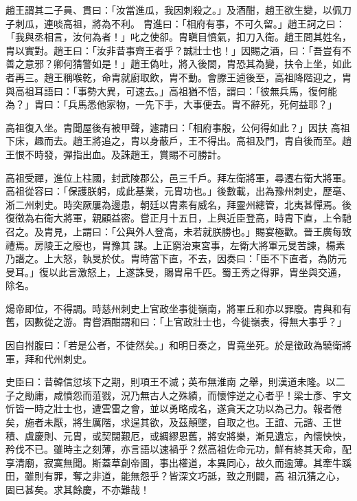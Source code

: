\begin{pinyinscope}
 趙王謂其二子員、貫曰：「汝當進瓜，我因刺殺之。」及酒酣，趙王欲生變，以佩刀子刺瓜，連啖高祖，將為不利。
 胄進曰：「相府有事，不可久留。」趙王訶之曰：「我與丞相言，汝何為者！」叱之使卻。胄瞋目憤氣，扣刀入衛。趙王問其姓名，胄以實對。趙王曰：「汝非昔事齊王者乎？誠壯士也！」因賜之酒，曰：「吾豈有不善之意邪？卿何猜警如是！」趙王偽吐，將入後閤，胄恐其為變，扶令上坐，如此者再三。趙王稱喉乾，命胄就廚取飲，胄不動。會滕王逌後至，高祖降階迎之，胄與高祖耳語曰：「事勢大異，可速去。」高祖猶不悟，謂曰：「彼無兵馬，復何能為？」胄曰：「兵馬悉他家物，一先下手，大事便去。胄不辭死，死何益耶？」



 高祖復入坐。胄聞屋後有被甲聲，遽請曰：「相府事殷，公何得如此？」因扶
 高祖下床，趣而去。趙王將追之，胄以身蔽戶，王不得出。高祖及門，胄自後而至。趙王恨不時發，彈指出血。及誅趙王，賞賜不可勝計。



 高祖受禪，進位上柱國，封武陵郡公，邑三千戶。拜左衛將軍，尋遷右衛大將軍。高祖從容曰：「保護朕躬，成此基業，元胄功也。」後數載，出為豫州刺史，歷亳、淅二州刺史。時突厥屢為邊患，朝廷以胄素有威名，拜靈州總管，北夷甚憚焉。後復徵為右衛大將軍，親顧益密。嘗正月十五日，上與近臣登高，時胄下直，上令馳召之。及胄見，上謂曰：「公與外人登高，未若就朕勝也。」賜宴極歡。晉王廣每致禮焉。房陵王之廢也，胄豫其
 謀。上正窮治東宮事，左衛大將軍元旻苦諫，楊素乃譖之。上大怒，執旻於仗。胄時當下直，不去，因奏曰：「臣不下直者，為防元旻耳。」復以此言激怒上，上遂誅旻，賜胄帛千匹。蜀王秀之得罪，胄坐與交通，除名。



 煬帝即位，不得調。時慈州刺史上官政坐事徙嶺南，將軍丘和亦以罪廢。胄與和有舊，因數從之游。胄嘗酒酣謂和曰：「上官政壯士也，今徙嶺表，得無大事乎？」



 因自拊腹曰：「若是公者，不徒然矣。」和明日奏之，胄竟坐死。於是徵政為驍衛將軍，拜和代州刺史。



 史臣曰：昔韓信愆垓下之期，則項王不滅；英布無淮南
 之舉，則漢道未隆。以二子之勛庸，咸憤怨而菹戮，況乃無古人之殊績，而懷悖逆之心者乎！梁士彥、宇文忻皆一時之壯士也，遭雲雷之會，並以勇略成名，遂貪天之功以為己力。報者倦矣，施者未厭，將生厲階，求逞其欲，及茲顛墜，自取之也。王誼、元諧、王世積、虞慶則、元胄，或契闊艱厄，或綢繆恩舊，將安將樂，漸見遺忘，內懷怏怏，矜伐不已。雖時主之刻薄，亦言語以速禍乎？然高祖佐命元功，鮮有終其天命，配享清廟，寂寞無聞。斯蓋草創帝圖，事出權道，本異同心，故久而逾薄。其牽牛蹊田，雖則有罪，奪之非道，能無怨乎？皆深文巧詆，致之刑闢，高
 祖沉猜之心，固已甚矣。求其餘慶，不亦難哉！



\end{pinyinscope}